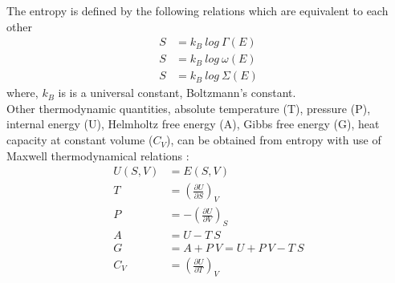  The entropy is defined by the following relations which are equivalent to each other 
 \begin{align}
 S &= k_B~log~\Gamma(E) \nonumber \\
 S &= k_B~log~\omega(E) \\
 S &= k_B~log~\Sigma(E) \nonumber
 \end{align}
 where, $k_B$ is is a universal constant,  Boltzmann's constant. \\
 Other thermodynamic quantities, absolute temperature (T),  pressure (P), internal energy (U), Helmholtz free energy (A), Gibbs free energy (G), heat capacity at constant volume ($C_V$), can be obtained from entropy with use of Maxwell thermodynamical  relations \citep{huang2009}: 
 \begin{align}
  U (S, V)& = E (S, V) \nonumber \\
    T & = \left(  \frac{ \partial U} {\partial S }\right)_V  \nonumber \\
   P  &  = - \left(  \frac{ \partial U} {\partial V }\right)_S  \\
    A & = U - T~S \nonumber \\
     G & = A + P~ V = U + P~V - T~ S \nonumber\\
     C_V & = \left(  \frac{ \partial U} {\partial T }\right)_V  \nonumber
 \end{align}
